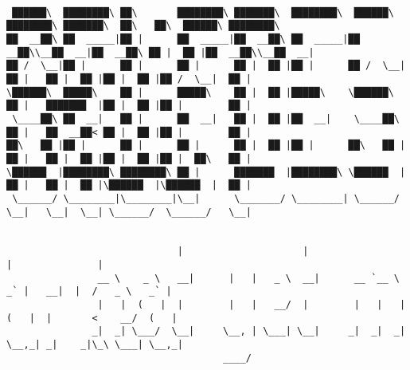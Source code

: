 \documentclass[varwidth=\maxdimen,margin=0.5cm,multi={verbatim}]{standalone}
\begin{document}
\begin{verbatim}

 ██████\  ████████\ ██\       ████████\ ███████\  ████████\  ██████\ ████████\ ███████\  ██\   ██\  ██████\ ████████\
██  __██\ ██  _____|██ |      ██  _____|██  __██\ ██  _____|██  __██\\__██  __|██  __██\ ██ |  ██ |██  __██\\__██  __|
██ /  \__|██ |      ██ |      ██ |      ██ |  ██ |██ |      ██ /  \__|  ██ |   ██ |  ██ |██ |  ██ |██ /  \__|  ██ |
\██████\  █████\    ██ |      █████\    ██ |  ██ |█████\    \██████\    ██ |   ███████  |██ |  ██ |██ |        ██ |
 \____██\ ██  __|   ██ |      ██  __|   ██ |  ██ |██  __|    \____██\   ██ |   ██  __██< ██ |  ██ |██ |        ██ |
██\   ██ |██ |      ██ |      ██ |      ██ |  ██ |██ |      ██\   ██ |  ██ |   ██ |  ██ |██ |  ██ |██ |  ██\   ██ |
\██████  |████████\ ████████\ ██ |      ███████  |████████\ \██████  |  ██ |   ██ |  ██ |\██████  |\██████  |  ██ |
 \______/ \________|\________|\__|      \_______/ \________| \______/   \__|   \__|  \__| \______/  \______/   \__|


                              |                     |                                |               |
                __ \    _ \   __|      |   |   _ \  __|      __ `__ \    _` |   __|  |  /   _ \   _` |
                |   |  (   |  |        |   |   __/  |        |   |   |  (   |  |       <    __/  (   |
               _|  _| \___/  \__|     \__, | \___| \__|     _|  _|  _| \__,_| _|    _|\_\ \___| \__,_|
                                      ____/



\end{verbatim}
\end{document}

